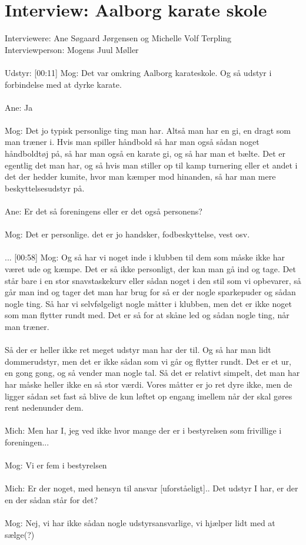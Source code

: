 \chapter{Interview: Aalborg karate skole}\label{ch:appElabel}
Interviewere: Ane Søgaard Jørgensen og Michelle Volf Terpling\\
Interviewperson: Mogens Juul Møller
\\\\
Udstyr:
[00:11]
Mog: Det var omkring Aalborg karateskole. Og så udstyr i forbindelse med at dyrke karate.
\\\\
Ane: Ja
\\\\
Mog: Det jo typisk personlige ting man har. Altså man har en gi, en dragt som man træner i. Hvis man spiller håndbold så har man også sådan noget håndboldtøj på, så har man også en karate gi, og så har man et bælte. Det er egentlig det man har, og så hvis man stiller op til kamp turnering eller et andet i det der hedder kumite, hvor man kæmper mod hinanden, så har man mere beskyttelsesudstyr på. 
\\\\
Ane: Er det så foreningens eller er det også personens? 
\\\\
Mog: Det er personlige. det er jo handsker, fodbeskyttelse, vest osv.
\\\\
...
[00:58]
Mog: Og så har vi noget inde i klubben til dem som måske ikke har været ude og kæmpe. Det er så ikke personligt, der kan man gå ind og tage. Det står bare i en stor snavstaskekurv eller sådan noget i den stil som vi opbevarer, så går man ind og tager det man har brug for så er der nogle sparkepuder og sådan nogle ting. Så har vi selvfølgeligt nogle måtter i klubben, men det er ikke noget som man flytter rundt med. Det er så for at skåne led og sådan nogle ting, når man træner.
\\\\
Så der er heller ikke ret meget udstyr man har der til.
Og så har man lidt dommerudstyr, men det er ikke sådan som vi går og flytter rundt. Det er et ur, en gong gong, og så vender man nogle tal. Så det er relativt simpelt, det man har har måske heller ikke en så stor værdi. 
Vores måtter er jo ret dyre ikke, men de ligger sådan set fast så blive de kun løftet op engang imellem når der skal gøres rent nedenunder dem.
\\\\
Mich: Men har I, jeg ved ikke hvor mange der er i bestyrelsen som frivillige i foreningen...
\\\\
Mog: Vi er fem i bestyrelsen
\\\\
Mich: Er der noget, med hensyn til ansvar [uforståeligt].. 
Det udstyr I har, er der en der sådan står for det?
\\\\
Mog: Nej, vi har ikke sådan nogle udstyrsansvarlige, vi hjælper lidt med at sælge(?) 



